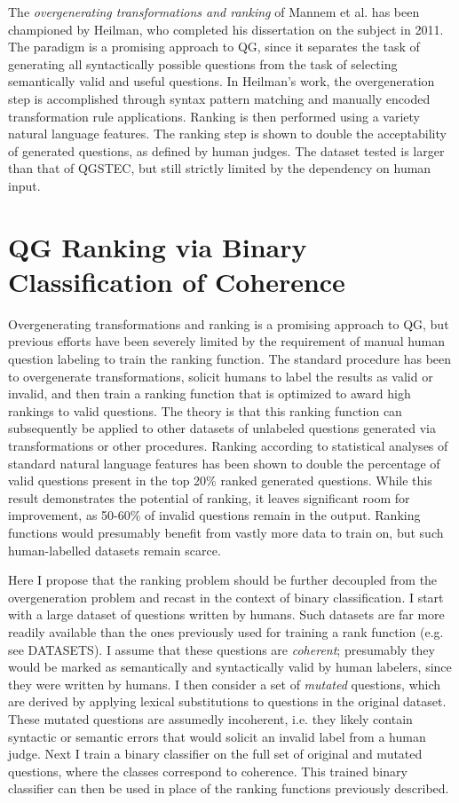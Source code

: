 The \textit{overgenerating transformations and ranking} of Mannem et al. has been championed by Heilman, who completed his dissertation on the subject in 2011. The paradigm is a promising approach to QG, since it separates the task of generating all syntactically possible questions from the task of selecting semantically valid and useful questions. In Heilman's work, the overgeneration step is accomplished through syntax pattern matching and manually encoded transformation rule applications. Ranking is then performed using a variety natural language features. The ranking step is shown to double the acceptability of generated questions, as defined by human judges. The dataset tested is larger than that of QGSTEC, but still strictly limited by the dependency on human input.

\section{QG Ranking via Binary Classification of Coherence}

Overgenerating transformations and ranking is a promising approach to QG, but previous efforts have been severely limited by the requirement of manual human question labeling to train the ranking function. The standard procedure has been to overgenerate transformations, solicit humans to label the results as valid or invalid, and then train a ranking function that is optimized to award high rankings to valid questions. The theory is that this ranking function can subsequently be applied to other datasets of unlabeled questions generated via transformations or other procedures. Ranking according to statistical analyses of standard natural language features has been shown to double the percentage of valid questions present in the top 20\% ranked generated questions. While this result demonstrates the potential of ranking, it leaves significant room for improvement, as 50-60\% of invalid questions remain in the output. Ranking functions would presumably benefit from vastly more data to train on, but such human-labelled datasets remain scarce.

Here I propose that the ranking problem should be further decoupled from the overgeneration problem and recast in the context of binary classification. I start with a large dataset of questions written by humans. Such datasets are far more readily available than the ones previously used for training a rank function (e.g. see DATASETS). I assume that these questions are \textit{coherent}; presumably they would be marked as semantically and syntactically valid by human labelers, since they were written by humans. I then consider a set of \textit{mutated} questions, which are derived by applying lexical substitutions to questions in the original dataset. These mutated questions are assumedly incoherent, i.e. they likely contain syntactic or semantic errors that would solicit an invalid label from a human judge. Next I train a binary classifier on the full set of original and mutated questions, where the classes correspond to coherence. This trained binary classifier can then be used in place of the ranking functions previously described.

